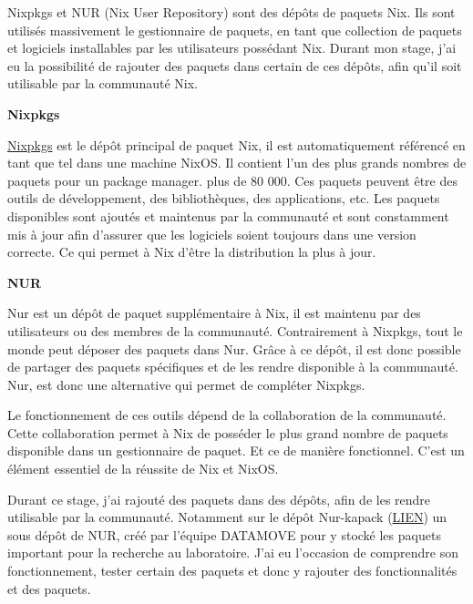 \documentclass[a4paper,french,12pt, titlepage]{article}
\begin{document}
Nixpkgs et NUR (Nix User Repository) sont des dépôts de paquets Nix. Ils
sont utilisés massivement le gestionnaire de paquets, en tant que
collection de paquets et logiciels installables par les utilisateurs
possédant Nix. Durant mon stage, j'ai eu la possibilité de rajouter des
paquets dans certain de ces dépôts, afin qu'il soit utilisable par la
communauté Nix.\newline

\textbf{Nixpkgs}\newline

\href{https://github.com/NixOS/nixpkgs}{Nixpkgs} est le dépôt principal
de paquet Nix, il est automatiquement référencé en tant que tel dans une
machine NixOS. Il contient l'un des plus grands nombres de paquets pour
un package manager. plus de 80 000. Ces paquets peuvent être des outils
de développement, des bibliothèques, des applications, etc. Les paquets
disponibles sont ajoutés et maintenus par la communauté et sont
constamment mis à jour afin d'assurer que les logiciels soient toujours
dans une version correcte. Ce qui permet à Nix d'être la distribution la
plus à jour.\newline

\textbf{NUR}\newline

Nur est un dépôt de paquet supplémentaire à Nix, il est maintenu par des
utilisateurs ou des membres de la communauté. Contrairement à Nixpkgs,
tout le monde peut déposer des paquets dans Nur. Grâce à ce dépôt, il
est donc possible de partager des paquets spécifiques et de les rendre
disponible à la communauté. Nur, est donc une alternative qui permet de
compléter Nixpkgs.\newline

Le fonctionnement de ces outils dépend de la collaboration de la
communauté. Cette collaboration permet à Nix de posséder le plus grand
nombre de paquets disponible dans un gestionnaire de paquet. Et ce de
manière fonctionnel. C'est un élément essentiel de la réussite de Nix et
NixOS.\newline

Durant ce stage, j'ai rajouté des paquets dans des dépôts, afin de les
rendre utilisable par la communauté. Notamment sur le dépôt Nur-kapack
(\href{https://github.com/oar-team/nur-kapack}{LIEN}) un sous dépôt de
NUR, créé par l'équipe DATAMOVE pour y stocké les paquets important pour
la recherche au laboratoire. J'ai eu l'occasion de comprendre son
fonctionnement, tester certain des paquets et donc y rajouter des
fonctionnalités et des paquets.
\end{document}
